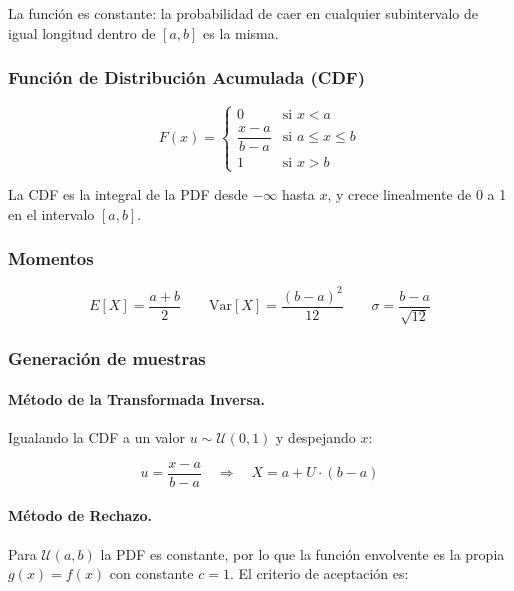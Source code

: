 La función es constante: la probabilidad de caer en cualquier subintervalo de igual longitud
dentro de $[a,b]$ es la misma.

\subsubsection{Función de Distribución Acumulada (CDF)}

\begin{equation}
F(x) =
\begin{cases}
0 & \text{si } x < a \\[4pt]
\dfrac{x - a}{b - a} & \text{si } a \leq x \leq b \\[6pt]
1 & \text{si } x > b
\end{cases}
\end{equation}

La CDF es la integral de la PDF desde $-\infty$ hasta $x$, y crece linealmente de 0 a 1
en el intervalo $[a, b]$.

\subsubsection{Momentos}

\begin{equation}
E[X] = \frac{a + b}{2} \qquad
\text{Var}[X] = \frac{(b-a)^2}{12} \qquad
\sigma = \frac{b - a}{\sqrt{12}}
\end{equation}

\subsubsection{Generación de muestras}

\paragraph{Método de la Transformada Inversa.}
Igualando la CDF a un valor $u \sim \mathcal{U}(0,1)$ y despejando $x$:

\begin{equation}
u = \frac{x - a}{b - a}
\quad \Longrightarrow \quad
\boxed{X = a + U \cdot (b - a)}
\end{equation}

\paragraph{Método de Rechazo.}
Para $\mathcal{U}(a,b)$ la PDF es constante, por lo que la función envolvente es la propia
$g(x) = f(x)$ con constante $c = 1$. El criterio de aceptación es:

